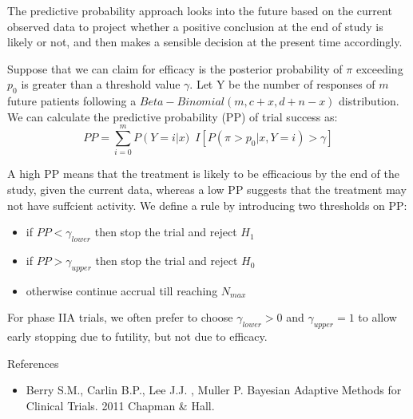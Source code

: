 \documentclass{beamer}
\begin{document}
\begin{frame}

The predictive probability approach looks into the future based on the
current observed data to project whether a positive conclusion at the
end of study is likely or not, and then makes a sensible decision at the
present time accordingly.

Suppose that we can claim for efficacy is the posterior probability of
\(\pi\) exceeding \(p_{0}\) is greater than a threshold value
\(\gamma\). Let Y be the number of responses of \(m\) future patients
following a \(Beta-Binomial\left(m,c+x,d+n-x\right)\) distribution.\\We
can calculate the predictive probability (PP) of trial success as: \[
PP=\sum_{i=0}^{m}{P\left(Y=i\right|x)}\phantom{0} I\left[P\left(\pi>p_{0}|x,Y=i\right)>\gamma\right]
\]

\end{frame}

\begin{frame}

A high PP means that the treatment is likely to be efficacious by the
end of the study, given the current data, whereas a low PP suggests that
the treatment may not have suffcient activity. We define a rule by
introducing two thresholds on PP:

\begin{itemize}
\itemsep1pt\parskip0pt
\item
  if \(PP<\gamma_{lower}\) then stop the trial and reject \(H_{1}\)
\item
  if \(PP>\gamma_{upper}\) then stop the trial and reject \(H_{0}\)
\item
  otherwise continue accrual till reaching \(N_{max}\)
\end{itemize}

For phase IIA trials, we often prefer to choose \(\gamma_{lower}>0\) and
\(\gamma_{upper}=1\) to allow early stopping due to futility, but not
due to efficacy.

\end{frame}

\begin{frame}{References}

\begin{itemize}
\itemsep1pt\parskip0pt
\item
  Berry S.M., Carlin B.P., Lee J.J. , Muller P. Bayesian Adaptive
  Methods for Clinical Trials. 2011 Chapman \& Hall.
\end{itemize}

\end{frame}
\end{document}
